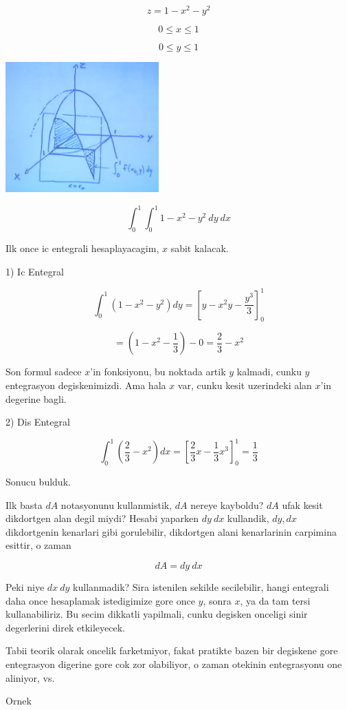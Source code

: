 \documentclass[12pt,fleqn]{article}
\begin{document}
\[ z = 1 - x^2 - y^2 \]

\[ 0 \le x \le 1 \]

\[ 0 \le y \le 1 \]

\includegraphics[height=5cm]{16_8.png}

\[ \int_0^1 \int_0^1  1-x^2-y^2 \ dy \ dx \]

Ilk once ic entegrali hesaplayacagim, $x$ sabit kalacak. 

1) Ic Entegral

\[ \int_0^1 (1-x^2-y^2) dy = [y - x^2y - \frac{y^3}{3}]_0^1 \]

\[ = (1 - x^2 - \frac{1}{3}) - 0 = \frac{2}{3} - x^2\]

Son formul sadece $x$'in fonksiyonu, bu noktada artik $y$ kalmadi, cunku
$y$ entegrasyon degiskenimizdi. Ama hala $x$ var, cunku kesit uzerindeki
alan $x$'in degerine bagli. 

2) Dis Entegral 

\[ \int_0^1 (\frac{2}{3} - x^2)dx = [\frac{2}{3}x - \frac{1}{3}x^3]_0^1 = 
\frac{1}{3}
 \]

Sonucu bulduk. 

Ilk basta $dA$ notasyonunu kullanmistik, $dA$ nereye kayboldu? $dA$ ufak
kesit dikdortgen alan degil miydi? Hesabi yaparken $dy \ dx$ kullandik,
$dy,dx$ dikdortgenin kenarlari gibi gorulebilir, dikdortgen alani
kenarlarinin carpimina esittir, o zaman 

\[ dA = dy \ dx \]

Peki niye $dx \ dy$ kullanmadik? Sira istenilen sekilde secilebilir, hangi
entegrali daha once hesaplamak istedigimize gore once $y$, sonra $x$, ya da
tam tersi kullanabiliriz. Bu secim dikkatli yapilmali, cunku degisken
onceligi sinir degerlerini direk etkileyecek. 

Tabii teorik olarak oncelik farketmiyor, fakat pratikte bazen bir degiskene
gore entegrasyon digerine gore cok zor olabiliyor, o zaman otekinin
entegrasyonu one aliniyor, vs.

Ornek
\end{document}
